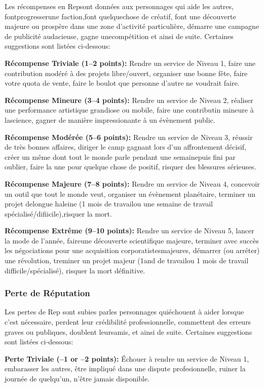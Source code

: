 Les récompenses en Repsont données aux personnages qui aide les autres, fontprogresserune faction,font quelquechose de créatif, font une découverte majeure ou prospère dans une zone d'activité particulière, démarre une campagne de publicité audacieuse, gagne unecompétition et ainsi de suite. Certaines suggestions sont listées ci-dessous: 

\textbf{Récompense Triviale (1–2 points):} Rendre un service de Niveau 1, faire une contribution modéré à des projets libre/ouvert, organiser une bonne fête, faire votre quota de vente, faire le boulot que personne d'autre ne voudrait faire. 

\textbf{Récompense Mineure (3–4 points):} Rendre un service de Niveau 2, réaliser une performance artistique grandiose ou mobile, faire une contributin mineure à lascience, gagner de manière impressionante à un évènement public. 

\textbf{Récompense Modérée (5–6 points):} Rendre un service de Niveau 3, réussir de très bonnes affaires, diriger le camp gagnant lors d'un affrontement décisif, créer un même dont tout le monde parle pendant une semainepuis fini par oublier, faire la une pour quelque chose de positif, risquer des blessures sérieuses. 

\textbf{Récompense Majeure (7–8 points):} Rendre un service de Niveau 4, concevoir un outil que tout le monde veut, organiser un évènement planétaire, terminer un projet delongue haleine (1 mois de travailou une semaine de travail spécialisé/difiicile),risquer la mort. 

\textbf{Récompense Extrême (9–10 points):} Rendre un service de Niveau 5, lancer la mode de l'année, faireune découverte scientifique majeure, terminer avec succès les négociations pour une acquisition corporatistesmajeures, démarrer (ou arréter) une révolution, treminer un projet majeur (1and de travailou 1 mois de travail difficile/spécialisé), risquer la mort définitive. 

\subsubsection{Perte de Réputation} 

Les pertes de Rep sont subies parles personnages quiéchouent à aider lorsque c'est nécessaire, perdent leur crédibilité professionnelle, commettent des erreurs graves ou publiques, doublent leursamis, et ainsi de suite. Certaines suggestions sont listées ci-dessous: 

\textbf{Perte Triviale (–1 or –2 points):} Échouer à rendre un service de Niveau 1, embarasser les autres, être impliqué dans une dispute profesionnelle, ruiner la journée de quelqu'un, n'être jamais disponible. 

